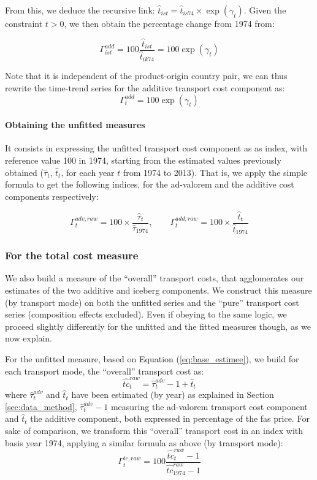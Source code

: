 \documentclass[a4paper,11pt]{article}
\begin{document}
From this, we deduce the recursive link: $\widehat{t}_{ist} = \widehat{t}_{is74} \times \exp(\gamma_t)$. Given the constraint $t>0$, we then obtain the percentage change from 1974 from:

\begin{equation}
\Gamma^{add}_{ist} = 100\frac{\widehat{t}_{ist}}{\widehat{t}_{ik74}} = 100\exp(\gamma_t) \label{eq:indice_add}
\end{equation}

\noindent Note that it is independent of the product-origin country pair, we can thus rewrite the time-trend series for the additive transport cost component as:
\begin{equation}
\Gamma^{add}_t  = 100\exp(\gamma_t) \label{eq:tcadd_compoeffect}
\end{equation}

\paragraph{Obtaining the unfitted measures} It consists in expressing the unfitted transport cost component as as index, with reference value 100 in 1974, starting from the estimated values previously obtained ($\widehat{\tau}_t$, $\widehat{t}_t$, for each year $t$ from 1974 to 2013). That is, we apply the simple formula to get the following indices, for the ad-valorem and the additive cost components respectively:

$$\Gamma^{adv, raw}_t = 100\times\frac{\widehat{\tau}_t}{\widehat{\tau}_{1974}},\qquad \Gamma^{add, raw}_t = 100\times\frac{\widehat{t}_t}{\widehat{t}_{1974}}$$

\subsubsection{For the total cost measure}

We also build a measure of the ``overall'' transport costs, that agglomerates our estimates of the two additive and iceberg components. We construct this measure (by transport mode) on both the unfitted series and the ``pure'' transport cost series (composition effects excluded). Even if obeying to the same logic, we proceed slightly differently for the unfitted and the fitted measures though, as we now explain.\smallskip

For the unfitted measure, based on Equation (\ref{eq:base_estimee}), we build for each transport mode, the ``overall'' transport cost as:
$$\widehat{tc}^{raw}_t= \widehat{\tau}^{adv}_t -1 + \widehat{t}_t$$
\noindent where $\widehat{\tau}^{adv}_t$ and $\widehat{t}_t$ have been estimated (by year) as explained in Section \ref{sec:data_method}, $\widehat{\tau}^{adv}_t-1$ measuring the ad-valorem transport cost component and $\widehat{t}_t$ the additive component, both expressed in percentage of the fas price. For sake of comparison, we transform this ``overall'' transport cost in an index with basis year 1974, applying a similar formula as above (by transport mode):
$$\Gamma^{tc, raw}_t = 100\frac{\widehat{tc}^{raw}_t -1 }{\widehat{tc}^{raw}_{1974}-1}$$
\end{document}
